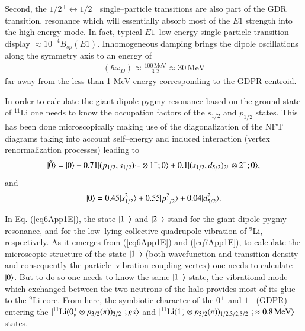 \begin{subappendices}
Second, the $1/2^+ \longleftrightarrow1/2^-$ single--particle transitions are also  part of the GDR transition, resonance which will essentially absorb most of the $E1$ strength into the high energy mode. In fact, typical $E1$--low energy single particle transition display $\approx 10^{-4}B_{sp}(E1)$. Inhomogeneous damping  brings the dipole oscillations along the symmetry axis to an energy of
\begin{align}
(\hbar\omega_D)\approx\frac{100\,\text{MeV}}{3.2}\approx 30\,\text{MeV}
\end{align}
far away from the less than 1 MeV energy corresponding to the GDPR centroid.

In order to calculate the giant dipole pygmy resonance based on the ground state of $^{11}$Li one needs to know the occupation factors of the $s_{1/2}$ and $p_{1/2}$ states. This has been done microscopically making use of the diagonalization of the NFT diagrams taking into account self--energy and induced interaction (vertex renormalization processes) leading to
\begin{align}\label{eq6App1E}
|{\tilde 0} \rangle=|{0} \rangle+0.71|{(p_{1/2},s_{1/2})_{1^-}\otimes1^-;0} \rangle+0.1|{(s_{1/2},d_{5/2})_{2^+}\otimes2^+;0} \rangle,
\end{align}
and 
\begin{align}\label{eq7App1E}
|{0} \rangle=0.45|{s_{1/2}^2} \rangle+0.55|{p_{1/2}^2} \rangle+0.04|{d_{5/2}^2} \rangle.
\end{align}

In Eq. (\ref{eq6App1E}), the state $|{1^-} \rangle$ and $|{2^+} \rangle$ stand for the giant dipole pygmy resonance, and for the low--lying collective quadrupole vibration of $^9$Li, respectively. As it emerges from (\ref{eq6App1E}) and (\ref{eq7App1E}), to calculate the microscopic structure of the state $|{1^-} \rangle$ (both wavefunction and transition density and consequently the particle--vibration coupling vertex) one needs to calculate $|{0} \rangle$. But to do so one needs to know the same $|{1^-} \rangle$ state, the vibrational mode which exchanged between the two neutrons of the halo provides most of its glue to the $^9$Li core. From here, the symbiotic character of the $0^+$ and $1^-$ (GDPR) entering the $|{^{11}\text{Li}(0^+_\nu\otimes p_{3/2}(\pi))_{3/2^-};gs} \rangle$ and $|{^{11}\text{Li}(1^-_\nu\otimes p_{3/2}(\pi))_{1/2,3/2,5/2^+};\approx 0.8\, \text{MeV}} \rangle$ states.



\end{subappendices}
